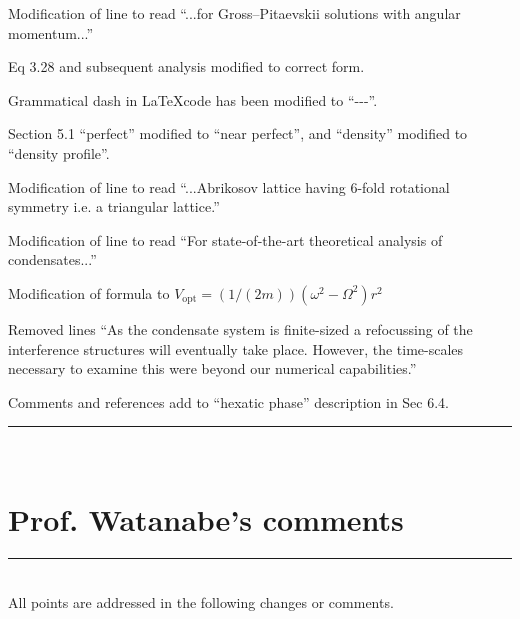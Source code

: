 \documentclass[paper=a4, fontsize=12pt]{scrartcl}
\begin{document}
\begin{description}[align=left]
    \item [P54] Modification of line to read ``...for Gross--Pitaevskii solutions with angular momentum...''
    \item [P59] Eq 3.28 and subsequent analysis modified to correct form.
    \item [P81] Grammatical dash in \LaTeX  code has been modified to ``-{}-{}-''.
    \item [P89] Section 5.1 ``perfect'' modified to ``near perfect'', and ``density'' modified to ``density profile''.
    \item [P89] Modification of line to read ``...Abrikosov lattice having 6-fold rotational symmetry i.e. a triangular lattice.''
    \item [P92] Modification of line to read ``For state-of-the-art theoretical analysis of condensates...''
    \item [P94] Modification of formula to $V_{\textrm{opt}} = (1/(2m))(\omega^2 - \Omega^2)r^2$
    \item [P101] Removed lines ``As the condensate system is finite-sized a refocussing of the interference structures will eventually take place. However, the time-scales necessary to examine this were beyond our numerical capabilities.''
    \item [P131] Comments and references add to ``hexatic phase'' description in Sec 6.4.
\end{description}
\noindent\rule{\textwidth}{1.5pt}\\[0.5cm]
\section{Prof. Watanabe's comments}
\rule{\textwidth}{1.5pt}\\[0.5cm]
All points are addressed in the following changes or comments.
\end{document}
